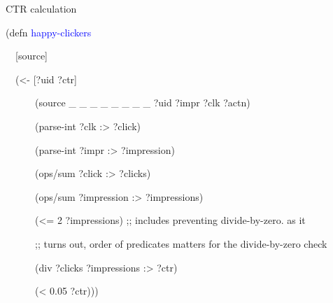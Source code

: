 \documentclass{beamer}
\begin{document}
\begin{frame}{CTR calculation}
\begin{small}
{\ttfamily\color{black}
\textcolor[rgb]{0.54901963,0.54901963,0.54901963}{(}\textcolor[rgb]{0.49803922,0.0,0.49803922}{defn}
\textcolor{blue}{happy-clickers}}

{\ttfamily\color{black}
\ \ [source]}

{\ttfamily\color{black}
\ \ \textcolor[rgb]{0.54901963,0.54901963,0.54901963}{(}{\textless}-
[?uid ?ctr]}


{\ttfamily\color{black}
\ \ \ \ \ \ \textcolor[rgb]{0.54901963,0.54901963,0.54901963}{(}source
\_ \_ \_ \_ \_ \_ \_ \_ ?uid ?impr ?clk
?actn\textcolor[rgb]{0.54901963,0.54901963,0.54901963}{)}}

{\ttfamily\color{black}
\ \ \ \ \ \ \textcolor[rgb]{0.54901963,0.54901963,0.54901963}{(}parse-int
?clk \textcolor[rgb]{0.0,0.54509807,0.54509807}{:{\textgreater}}
?click\textcolor[rgb]{0.54901963,0.54901963,0.54901963}{)}}

{\ttfamily\color{black}
\ \ \ \ \ \ \textcolor[rgb]{0.54901963,0.54901963,0.54901963}{(}parse-int
?impr \textcolor[rgb]{0.0,0.54509807,0.54509807}{:{\textgreater}}
?impression\textcolor[rgb]{0.54901963,0.54901963,0.54901963}{)}}

{\ttfamily\color{black}
\ \ \ \ \ \ \textcolor[rgb]{0.54901963,0.54901963,0.54901963}{(}ops/sum
?click \textcolor[rgb]{0.0,0.54509807,0.54509807}{:{\textgreater}}
?clicks\textcolor[rgb]{0.54901963,0.54901963,0.54901963}{)}}

{\ttfamily\color{black}
\ \ \ \ \ \ \textcolor[rgb]{0.54901963,0.54901963,0.54901963}{(}ops/sum
?impression \textcolor[rgb]{0.0,0.54509807,0.54509807}{:{\textgreater}}
?impressions\textcolor[rgb]{0.54901963,0.54901963,0.54901963}{)}}

{\ttfamily\color{black}
\ \ \ \ \ \ \textcolor[rgb]{0.54901963,0.54901963,0.54901963}{(}\textcolor[rgb]{0.28235295,0.23921569,0.54509807}{{\textless}=}
2 ?impressions\textcolor[rgb]{0.54901963,0.54901963,0.54901963}{)}
\textcolor[rgb]{0.69803923,0.13333334,0.13333334}{;; includes
preventing divide-by-zero. as it}}

{\ttfamily\color{black}
\ \ \ \ \ \ \textcolor[rgb]{0.69803923,0.13333334,0.13333334}{;; turns
out, order of predicates matters for the divide-by-zero check }}

{\ttfamily\color{black}
\ \ \ \ \ \ \textcolor[rgb]{0.54901963,0.54901963,0.54901963}{(}div
?clicks ?impressions
\textcolor[rgb]{0.0,0.54509807,0.54509807}{:{\textgreater}}
?ctr\textcolor[rgb]{0.54901963,0.54901963,0.54901963}{)}}

{\ttfamily\color{black}
\ \ \ \ \ \ \textcolor[rgb]{0.54901963,0.54901963,0.54901963}{(}\textcolor[rgb]{0.28235295,0.23921569,0.54509807}{{\textless}}
0.05 ?ctr\textcolor[rgb]{0.54901963,0.54901963,0.54901963}{)))}}

\end{small}
\end{frame}
\end{document}
